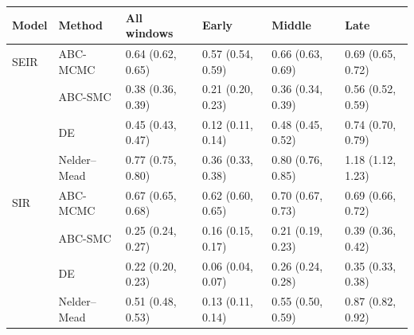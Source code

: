 \begin{tabular}{llllll}
\toprule
Model & Method & All windows & Early & Middle & Late \\
\midrule
SEIR & ABC-MCMC & 0.64 (0.62, 0.65) & 0.57 (0.54, 0.59) & 0.66 (0.63, 0.69) & 0.69 (0.65, 0.72) \\
 & ABC-SMC & 0.38 (0.36, 0.39) & 0.21 (0.20, 0.23) & 0.36 (0.34, 0.39) & 0.56 (0.52, 0.59) \\
 & DE & 0.45 (0.43, 0.47) & 0.12 (0.11, 0.14) & 0.48 (0.45, 0.52) & 0.74 (0.70, 0.79) \\
 & Nelder--Mead & 0.77 (0.75, 0.80) & 0.36 (0.33, 0.38) & 0.80 (0.76, 0.85) & 1.18 (1.12, 1.23) \\
\midrule
SIR & ABC-MCMC & 0.67 (0.65, 0.68) & 0.62 (0.60, 0.65) & 0.70 (0.67, 0.73) & 0.69 (0.66, 0.72) \\
 & ABC-SMC & 0.25 (0.24, 0.27) & 0.16 (0.15, 0.17) & 0.21 (0.19, 0.23) & 0.39 (0.36, 0.42) \\
 & DE & 0.22 (0.20, 0.23) & 0.06 (0.04, 0.07) & 0.26 (0.24, 0.28) & 0.35 (0.33, 0.38) \\
 & Nelder--Mead & 0.51 (0.48, 0.53) & 0.13 (0.11, 0.14) & 0.55 (0.50, 0.59) & 0.87 (0.82, 0.92) \\
\bottomrule
\end{tabular}
